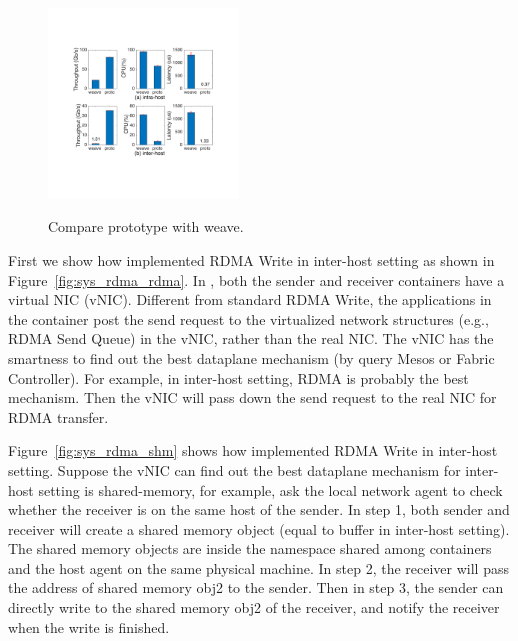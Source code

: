      \begin{figure}[ht]
     \centering 
     \includegraphics[width=0.45\textwidth]{figures/system/eval_proto.pdf}
     \label{fig:sys_eval_proto}
     \caption{Compare \sysname prototype with weave.} 
     \end{figure}


\iffalse
{} First we show 
how \sysname implemented RDMA Write in inter-host setting
as shown in Figure~\ref{fig:sys_rdma_rdma}. 
In \sysname, both the sender and receiver containers have a virtual NIC (vNIC).
Different from standard RDMA Write, the applications in the container post
the send request to the virtualized network structures (e.g., RDMA Send Queue)
in the vNIC, rather than the real NIC.
The vNIC has the smartness to find out the best dataplane mechanism (by query
Mesos or Fabric Controller).
For example, in inter-host setting, RDMA is probably the best mechanism. Then
the vNIC will pass down the send request to the real NIC for RDMA transfer.


 Figure~\ref{fig:sys_rdma_shm} shows 
how \sysname implemented RDMA Write in inter-host setting.
Suppose the vNIC can find out the best dataplane mechanism for inter-host setting
is shared-memory, for example, ask the local network agent to check whether the 
receiver is on the same host of the sender.
 In step 1, both sender and receiver will create a shared memory object (equal 
to buffer in inter-host setting). The shared memory objects are inside the namespace
shared among containers and the host agent on the same physical machine.
In step 2, the receiver will pass the address of shared memory obj2 to the sender.
Then in step 3, the sender can directly write to the shared memory obj2 of the
receiver, and notify the receiver when the write is finished.





